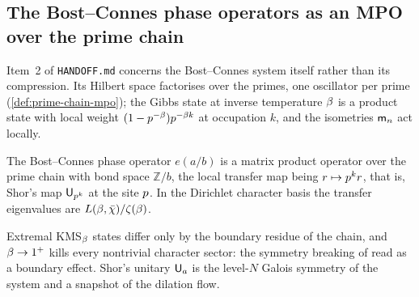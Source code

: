 \subsection{The Bost--Connes phase operators as an MPO over the prime chain}

Item~2 of \texttt{HANDOFF.md} concerns the Bost--Connes system itself rather than its
compression. Its Hilbert space factorises over the primes, one oscillator per prime
(\cref{def:prime-chain-mpo}); the Gibbs state at inverse temperature $\beta$ is a
product state with local weight $(1-p^{-\beta})p^{-\beta k}$ at occupation $k$,
and the isometries $\mathsf m_{n}$ act locally.

\begin{proposition}
\label{prop:bc-mpo}
The Bost--Connes phase operator $e(a/b)$ is a matrix product operator over the prime chain
with bond space $\mathbb Z/b$, the local transfer map being $r\mapsto p^k r$, that is,
Shor's map $\mathsf U_{p^k}$ at the site $p$. In the Dirichlet character basis the transfer
eigenvalues are $L(\beta,\bar\chi)/\zeta(\beta)$.
\end{proposition}

Extremal KMS$_\beta$ states differ only by the boundary residue of the chain, and
$\beta\to1^{+}$ kills every nontrivial character sector: the symmetry breaking of
\cite{bostconnes1995} read as a boundary effect. Shor's unitary $\mathsf U_{a}$ is the
level-$N$ Galois symmetry of the system and a snapshot of the dilation flow.


